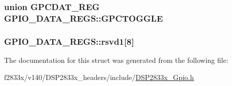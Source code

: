 \subsubsection[{G\+P\+C\+T\+O\+G\+G\+L\+E}]{\setlength{\rightskip}{0pt plus 5cm}union {\bf G\+P\+C\+D\+A\+T\+\_\+\+R\+E\+G} G\+P\+I\+O\+\_\+\+D\+A\+T\+A\+\_\+\+R\+E\+G\+S\+::\+G\+P\+C\+T\+O\+G\+G\+L\+E}\label{struct_g_p_i_o___d_a_t_a___r_e_g_s_ab75bb29f5c79d2cfa1a7158da99bbfec}
\hypertarget{struct_g_p_i_o___d_a_t_a___r_e_g_s_ae33ce91255743df8b4221c0c70d64792}{}
\subsubsection[{rsvd1}]{ G\+P\+I\+O\+\_\+\+D\+A\+T\+A\+\_\+\+R\+E\+G\+S\+::rsvd1\mbox{[}8\mbox{]}}\label{struct_g_p_i_o___d_a_t_a___r_e_g_s_ae33ce91255743df8b4221c0c70d64792}


The documentation for this struct was generated from the following file\+:\begin{DoxyCompactItemize}
\item 
f2833x/v140/\+D\+S\+P2833x\+\_\+headers/include/\hyperlink{_d_s_p2833x___gpio_8h}{D\+S\+P2833x\+\_\+\+Gpio.\+h}\end{DoxyCompactItemize}
